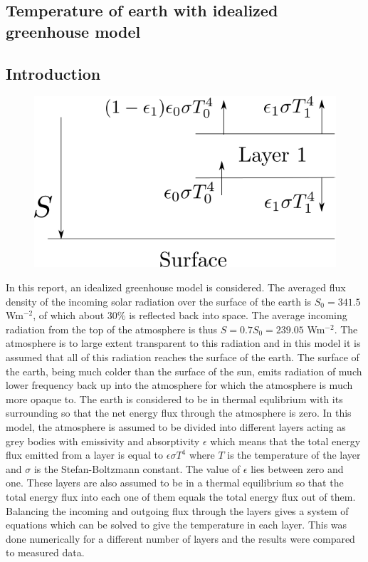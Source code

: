 \documentclass[twocolumn]{article}
\begin{document}
\begin{large}

\section*{Temperature of earth with idealized greenhouse model}
\subsection*{Introduction}
\begin{figure}[b!]
    \includegraphics[scale=0.5]{Layer1.png}
    \caption{}
    \label{11maj1748}
\end{figure}
In this report, an idealized greenhouse model is considered. The averaged flux density of the incoming solar radiation over the surface of the earth is $S_0 = 341.5$ Wm$^{-2}$, of which about $30$\% is reflected back into space. The average incoming radiation from the top of the atmosphere is thus $S = 0.7S_0 = 239.05$ Wm$^{-2}$. The atmosphere is to large extent transparent to this radiation and in this model it is assumed that all of this radiation reaches the surface of the earth. The surface of the earth, being much colder than the surface of the sun, emits radiation of much lower frequency back up into the atmosphere for which the atmosphere is much more opaque to.  The earth is considered to be in thermal equlibrium with its surrounding so that the net energy flux through the atmosphere is zero. In this model, the atmosphere is assumed to be divided into different layers acting as grey bodies with emissivity and absorptivity $\epsilon$ which means that the total energy flux emitted from a layer is equal to $\epsilon\sigma T^4$ where $T$ is the temperature of the layer and $\sigma$ is the Stefan-Boltzmann constant. The value of $\epsilon$ lies between zero and one. These layers are also assumed to be in a thermal equilibrium so that the total energy flux into each one of them equals the total energy flux out of them. Balancing the incoming and outgoing flux through the layers gives a system of equations which can be solved to give the temperature in each layer. This was done numerically for a different number of layers and the results were compared to measured data. 


\end{large}
\end{document}
